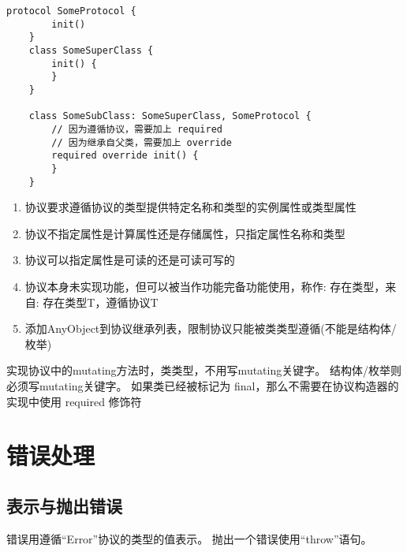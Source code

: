 \documentclass{../main.tex}{subfiles}
\begin{document}
\begin{lstlisting}[style = lstCodeStyleSwift, title = {协议构造器+子类重写父类}]
    protocol SomeProtocol {
        init()
    }
    class SomeSuperClass {
        init() {
        }
    }

    class SomeSubClass: SomeSuperClass, SomeProtocol {
        // 因为遵循协议，需要加上 required
        // 因为继承自父类，需要加上 override
        required override init() {
        }
    }
\end{lstlisting}

\begin{enumerate}[itemsep=0pt, parsep=0pt, topsep=0pt, partopsep=0pt]
    \item 协议要求遵循协议的类型提供特定名称和类型的实例属性或类型属性
    \item 协议不指定属性是计算属性还是存储属性，只指定属性名称和类型
    \item 协议可以指定属性是可读的还是可读可写的
    \item 协议本身未实现功能，但可以被当作功能完备功能使用，称作: 存在类型，来自: 存在类型T，遵循协议T
    \item 添加AnyObject到协议继承列表，限制协议只能被类类型遵循(不能是结构体/枚举)
\end{enumerate}
\begin{artCaution}
实现协议中的mutating方法时，类类型，不用写mutating关键字。
结构体/枚举则必须写mutating关键字。
如果类已经被标记为 final，那么不需要在协议构造器的实现中使用 required 修饰符
\end{artCaution}



\section{错误处理}



\subsection{表示与抛出错误}
错误用遵循``Error''协议的类型的值表示。
抛出一个错误使用``throw''语句。
\end{document}
